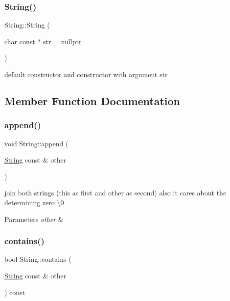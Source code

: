 \subsubsection{\texorpdfstring{String()}{String()}}
{\footnotesize\ttfamily String\+::\+String (\begin{DoxyParamCaption}\item[{char const $\ast$}]{str = {\ttfamily nullptr} }\end{DoxyParamCaption})}



default constructor and constructor with argument str 



\subsection{Member Function Documentation}
\mbox{\label{classString_a8a191fafb7af689d86f50423e97e60d7}} 
\subsubsection{\texorpdfstring{append()}{append()}}
{\footnotesize\ttfamily void String\+::append (\begin{DoxyParamCaption}\item[{\hyperlink{classString}{String} const \&}]{other }\end{DoxyParamCaption})}

join both strings (this as first and other as second) also it cares about the determining zero \textquotesingle{}\textbackslash{}0\textquotesingle{} 
\begin{DoxyParams}{Parameters}
{\em other} & \\
\hline
\end{DoxyParams}
\mbox{\label{classString_a16b809e6c0a80889b2ee8e753003ab70}} 
\subsubsection{\texorpdfstring{contains()}{contains()}}
{\footnotesize\ttfamily bool String\+::contains (\begin{DoxyParamCaption}\item[{\hyperlink{classString}{String} const \&}]{other }\end{DoxyParamCaption}) const}

